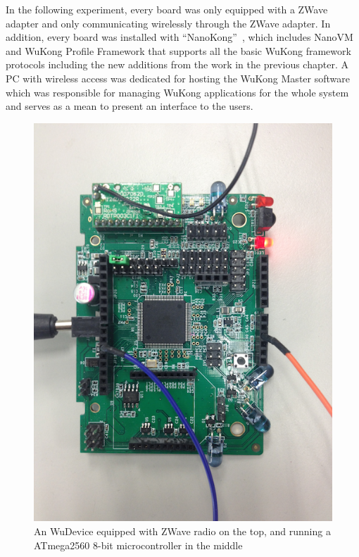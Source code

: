 In the following experiment, every board was only equipped with a ZWave adapter
and only communicating wirelessly through the ZWave adapter. In addition, every
board was installed with “NanoKong”~\cite{Su}, which includes
NanoVM~\cite{Harbaum2006} and WuKong Profile Framework that supports all the
basic WuKong framework protocols including the new additions from the work in
the previous chapter. A PC with wireless access was dedicated for hosting the
WuKong Master software which was responsible for managing WuKong applications
for the whole system and serves as a mean to present an interface to the users.  

\begin{figure}[h!]
\centering
    \includegraphics[width=\linewidth]{figures/wudevice}
\caption{An WuDevice equipped with ZWave radio on the top, and running
  a ATmega2560 8-bit microcontroller in the middle}
\label{fig:wudevice}
\end{figure}

